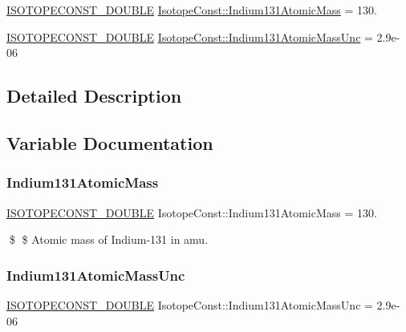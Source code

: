 \begin{DoxyCompactItemize}
\item 
\mbox{\hyperlink{group___isotope_const-_macros_ga8f45a7272ce02c0b4c65c44636ed719a}{I\+S\+O\+T\+O\+P\+E\+C\+O\+N\+S\+T\+\_\+\+D\+O\+U\+B\+LE}} \mbox{\hyperlink{group___isotope_const-_indium-_in131_ga70a3421e0fe9a22e845c74008aa3d59e}{Isotope\+Const\+::\+Indium131\+Atomic\+Mass}} = 130.
\item 
\mbox{\hyperlink{group___isotope_const-_macros_ga8f45a7272ce02c0b4c65c44636ed719a}{I\+S\+O\+T\+O\+P\+E\+C\+O\+N\+S\+T\+\_\+\+D\+O\+U\+B\+LE}} \mbox{\hyperlink{group___isotope_const-_indium-_in131_gaf7fc7a75af8cf8f9b6ddc8a576a76021}{Isotope\+Const\+::\+Indium131\+Atomic\+Mass\+Unc}} = 2.\+9e-\/06
\end{DoxyCompactItemize}


\subsection{Detailed Description}


\subsection{Variable Documentation}
\mbox{\label{group___isotope_const-_indium-_in131_ga70a3421e0fe9a22e845c74008aa3d59e}} 
\subsubsection{\texorpdfstring{Indium131\+Atomic\+Mass}{Indium131AtomicMass}}
{\footnotesize\ttfamily \mbox{\hyperlink{group___isotope_const-_macros_ga8f45a7272ce02c0b4c65c44636ed719a}{I\+S\+O\+T\+O\+P\+E\+C\+O\+N\+S\+T\+\_\+\+D\+O\+U\+B\+LE}} Isotope\+Const\+::\+Indium131\+Atomic\+Mass = 130.}

\$ \$ Atomic mass of Indium-\/131 in amu. \mbox{\label{group___isotope_const-_indium-_in131_gaf7fc7a75af8cf8f9b6ddc8a576a76021}} 
\subsubsection{\texorpdfstring{Indium131\+Atomic\+Mass\+Unc}{Indium131AtomicMassUnc}}
{\footnotesize\ttfamily \mbox{\hyperlink{group___isotope_const-_macros_ga8f45a7272ce02c0b4c65c44636ed719a}{I\+S\+O\+T\+O\+P\+E\+C\+O\+N\+S\+T\+\_\+\+D\+O\+U\+B\+LE}} Isotope\+Const\+::\+Indium131\+Atomic\+Mass\+Unc = 2.\+9e-\/06}

